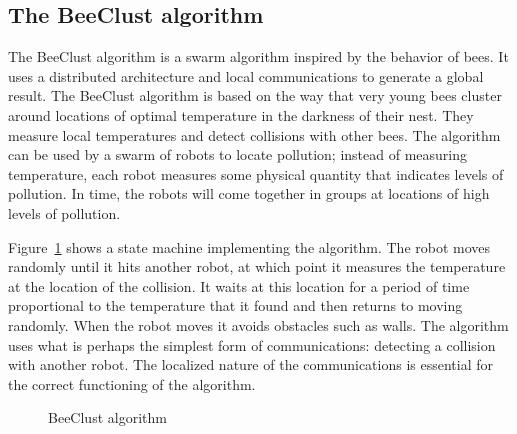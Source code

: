 \subsection{The BeeClust algorithm}


The BeeClust algorithm is a swarm algorithm inspired by the behavior of bees. It uses a distributed architecture and local communications to generate a global result. The BeeClust algorithm is based on the way that very young bees cluster around locations of optimal temperature in the darkness of their nest. They measure local temperatures and detect collisions with other bees.  The algorithm can be used by a swarm of robots to locate pollution; instead of measuring temperature, each robot measures some physical quantity that indicates levels of pollution. In time, the robots will come together in groups at locations of high levels of pollution.

Figure~\ref{fig.beeclust} shows a state machine implementing the algorithm. The robot moves randomly until it hits another robot, at which point it measures the temperature at the location of the collision. It waits at this location for a period of time proportional to the temperature that it found and then returns to moving randomly. When the robot moves it avoids obstacles such as walls. The algorithm uses what is perhaps the simplest form of communications: detecting a collision with another robot. The localized nature of the communications is essential for the correct functioning of the algorithm.

\begin{figure}
\begin{center}
\end{center}
\caption{BeeClust algorithm}\label{fig.beeclust}
\end{figure}

